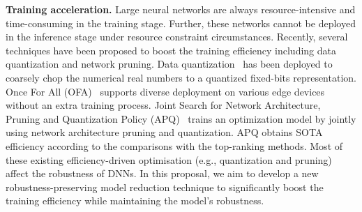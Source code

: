 {\textbf{Training acceleration.}}
Large neural networks are always resource-intensive and time-consuming in the training stage. Further, these networks cannot be deployed in the inference stage under resource constraint circumstances. Recently, several techniques have been proposed to boost the training efficiency including data quantization and network pruning. 
Data quantization~\cite{wang2020apq} has been deployed to coarsely chop the numerical real numbers to a quantized fixed-bits representation. 
Once For All (OFA)~\cite{cai2020once} supports diverse deployment on various edge devices without an extra training process. 
Joint Search for Network Architecture, Pruning and Quantization Policy (APQ)~\cite{wang2020apq} trains an optimization model by jointly using network architecture pruning and quantization. APQ obtains SOTA efficiency according to the comparisons with the top-ranking methods.
Most of these existing efficiency-driven optimisation (e.g., quantization and pruning) affect the robustness of DNNs. 
In this proposal, we aim to develop a new robustness-preserving model reduction technique to significantly boost the training efficiency while maintaining the model's robustness.

